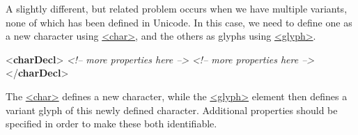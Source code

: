 A slightly different, but related problem occurs when we have multiple variants, none of which has been defined in Unicode. In this case, we need to define one as a new character using \hyperref[TEI.char]{<char>}, and the others as glyphs using \hyperref[TEI.glyph]{<glyph>}. \par\bgroup{}\exampleFont \begin{shaded}\noindent\mbox{}{<\textbf{charDecl}>}\mbox{}\newline 
{}\mbox{}\newline 
\textit{<!-- more properties here -->}\mbox{}\newline 
{}\mbox{}\newline 
{}\mbox{}\newline 
\textit{<!-- more properties here -->}\mbox{}\newline 
\hspace*{1em}\mbox{}\newline 
\hspace*{1em}\hspace*{1em}\mbox{}\newline 
\hspace*{1em}\mbox{}\newline 
{}\mbox{}\newline 
{</\textbf{charDecl}>}\end{shaded}\egroup\par \noindent  The \hyperref[TEI.char]{<char>} defines a new character, while the \hyperref[TEI.glyph]{<glyph>} element then defines a variant glyph of this newly defined character. Additional properties should be specified in order to make these both identifiable.
